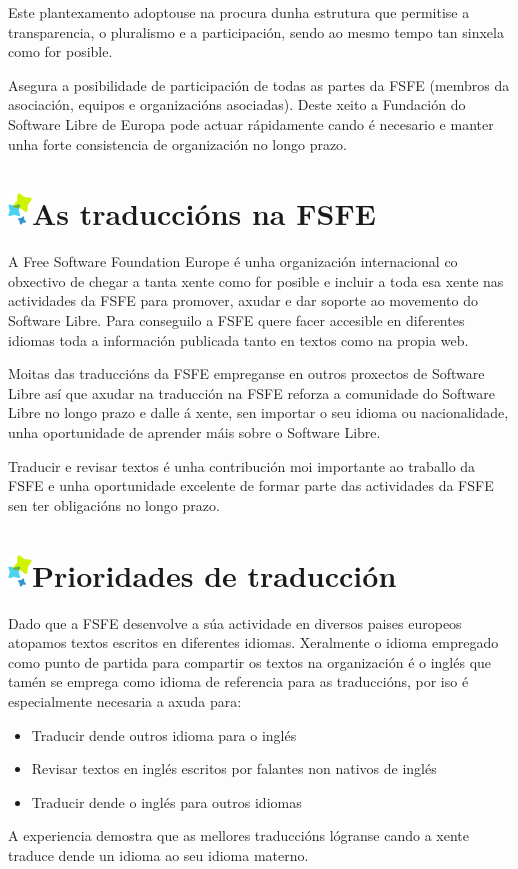 \documentclass[10pt,foldmark,tumble]{leaflet}
\newcommand{\tit}[1]{\section{\protect\includegraphics{item.png}#1}}
\begin{document}
Este plantexamento adoptouse na procura dunha estrutura que permitise a transparencia, o pluralismo e a participación, sendo ao mesmo tempo tan sinxela como for posible.

Asegura a posibilidade de participación de todas as partes da FSFE (membros da asociación, equipos e organizacións asociadas). Deste xeito a Fundación do Software Libre de Europa pode actuar rápidamente cando é necesario e manter unha forte consistencia de organización no longo prazo.

\tit{As traduccións na FSFE}

A Free Software Foundation Europe é unha organización internacional co obxectivo de chegar a tanta xente como for posible e incluir a toda esa xente nas actividades da FSFE para promover, axudar e dar soporte ao movemento do Software Libre. Para conseguilo a FSFE quere facer accesible en diferentes idiomas toda a información publicada tanto en textos como na propia web.

Moitas das traduccións da FSFE empreganse en outros proxectos de Software Libre así que axudar na traducción na FSFE reforza a comunidade do Software Libre no longo prazo e dalle á xente, sen importar o seu idioma ou nacionalidade, unha oportunidade de aprender máis sobre o Software Libre.

Traducir e revisar textos é unha contribución moi importante ao traballo da FSFE e unha oportunidade excelente de formar parte das actividades da FSFE sen ter obligacións no longo prazo.

\tit{Prioridades de traducción}

Dado que a FSFE desenvolve a súa actividade en diversos paises europeos atopamos textos escritos en diferentes idiomas. Xeralmente o idioma empregado como punto de partida para compartir os textos na organización é o inglés que tamén se emprega como idioma de referencia para as traduccións, por iso é especialmente necesaria a axuda para: 

\begin{itemize}
    \item Traducir dende outros idioma para o inglés
    \item Revisar textos en inglés escritos por falantes non nativos de inglés
    \item Traducir dende o inglés para outros idiomas
\end{itemize}

A experiencia demostra que as mellores traduccións lógranse cando a xente traduce dende un idioma ao seu idioma materno. 
\end{document}
